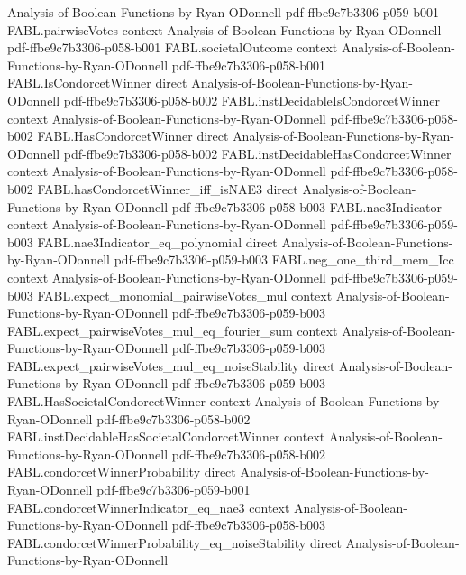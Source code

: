 \begin{theorem}
  {Analysis-of-Boolean-Functions-by-Ryan-ODonnell}
  {pdf-ffbe9c7b3306-p059-b001}
\proofstep
  {FABL.pairwiseVotes}
  {context}
  {Analysis-of-Boolean-Functions-by-Ryan-ODonnell}
  {pdf-ffbe9c7b3306-p058-b001}
\proofstep
  {FABL.societalOutcome}
  {context}
  {Analysis-of-Boolean-Functions-by-Ryan-ODonnell}
  {pdf-ffbe9c7b3306-p058-b001}
\proofstep
  {FABL.IsCondorcetWinner}
  {direct}
  {Analysis-of-Boolean-Functions-by-Ryan-ODonnell}
  {pdf-ffbe9c7b3306-p058-b002}
\proofstep
  {FABL.instDecidableIsCondorcetWinner}
  {context}
  {Analysis-of-Boolean-Functions-by-Ryan-ODonnell}
  {pdf-ffbe9c7b3306-p058-b002}
\proofstep
  {FABL.HasCondorcetWinner}
  {direct}
  {Analysis-of-Boolean-Functions-by-Ryan-ODonnell}
  {pdf-ffbe9c7b3306-p058-b002}
\proofstep
  {FABL.instDecidableHasCondorcetWinner}
  {context}
  {Analysis-of-Boolean-Functions-by-Ryan-ODonnell}
  {pdf-ffbe9c7b3306-p058-b002}
\proofstep
  {FABL.hasCondorcetWinner_iff_isNAE3}
  {direct}
  {Analysis-of-Boolean-Functions-by-Ryan-ODonnell}
  {pdf-ffbe9c7b3306-p058-b003}
\proofstep
  {FABL.nae3Indicator}
  {context}
  {Analysis-of-Boolean-Functions-by-Ryan-ODonnell}
  {pdf-ffbe9c7b3306-p059-b003}
\proofstep
  {FABL.nae3Indicator_eq_polynomial}
  {direct}
  {Analysis-of-Boolean-Functions-by-Ryan-ODonnell}
  {pdf-ffbe9c7b3306-p059-b003}
\proofstep
  {FABL.neg_one_third_mem_Icc}
  {context}
  {Analysis-of-Boolean-Functions-by-Ryan-ODonnell}
  {pdf-ffbe9c7b3306-p059-b003}
\proofstep
  {FABL.expect_monomial_pairwiseVotes_mul}
  {context}
  {Analysis-of-Boolean-Functions-by-Ryan-ODonnell}
  {pdf-ffbe9c7b3306-p059-b003}
\proofstep
  {FABL.expect_pairwiseVotes_mul_eq_fourier_sum}
  {context}
  {Analysis-of-Boolean-Functions-by-Ryan-ODonnell}
  {pdf-ffbe9c7b3306-p059-b003}
\proofstep
  {FABL.expect_pairwiseVotes_mul_eq_noiseStability}
  {direct}
  {Analysis-of-Boolean-Functions-by-Ryan-ODonnell}
  {pdf-ffbe9c7b3306-p059-b003}
\proofstep
  {FABL.HasSocietalCondorcetWinner}
  {context}
  {Analysis-of-Boolean-Functions-by-Ryan-ODonnell}
  {pdf-ffbe9c7b3306-p058-b002}
\proofstep
  {FABL.instDecidableHasSocietalCondorcetWinner}
  {context}
  {Analysis-of-Boolean-Functions-by-Ryan-ODonnell}
  {pdf-ffbe9c7b3306-p058-b002}
\proofstep
  {FABL.condorcetWinnerProbability}
  {direct}
  {Analysis-of-Boolean-Functions-by-Ryan-ODonnell}
  {pdf-ffbe9c7b3306-p059-b001}
\proofstep
  {FABL.condorcetWinnerIndicator_eq_nae3}
  {context}
  {Analysis-of-Boolean-Functions-by-Ryan-ODonnell}
  {pdf-ffbe9c7b3306-p058-b003}
\proofstep
  {FABL.condorcetWinnerProbability_eq_noiseStability}
  {direct}
  {Analysis-of-Boolean-Functions-by-Ryan-ODonnell}

\end{theorem}
